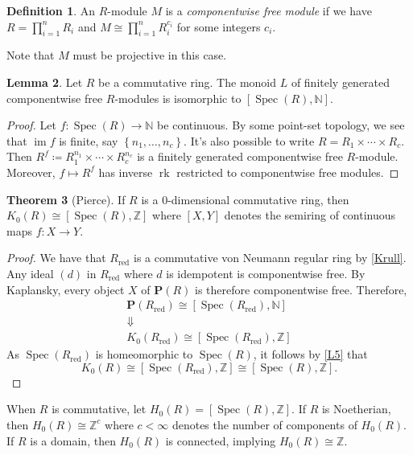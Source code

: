 \documentclass[10pt,letterpaper,cm]{nupset}
\theoremstyle{definition}
\newtheorem{definition}{Definition}[section]
\theoremstyle{theorem}
\newtheorem{theorem}[definition]{Theorem}
\newtheorem{lemma}[definition]{Lemma}
\theoremstyle{remark}
\newcommand{\N}{\mathbb N}
\renewcommand{\P}{\mathbf P}
\newcommand{\Z}{\mathbb Z}
\newcommand{\1}{\mathbf{1}}
\newcommand{\0}{\vec 0}
\DeclareMathOperator{\im}{im}
\DeclareMathOperator{\red}{red}
\DeclareMathOperator{\spec}{Spec}
\DeclareMathOperator{\rk}{rk}
\begin{document}
\begin{definition}
An $R$-module $M$ is a \textit{componentwise free module} if we have $R = \prod_{i=1}^n R_i$ and $M \cong \prod_{i=1}^n R_i^{c_i}$ for some integers $c_i$.
\end{definition}

Note that $M$ must be projective in this case.

\begin{lemma}\label{L6}
Let $R$ be a commutative ring. The monoid $L$ of finitely generated componentwise free $R$-modules is isomorphic to $\left[\spec(R), \N\right]$.
\end{lemma}
\begin{proof}
Let $f: \spec(R) \to \N$ be continuous. By some point-set topology, we see that $\im f$ is finite, say $\left\{n_1, \ldots, n_c\right\}$. It's also possible to write $R= R_1 \times \cdots \times R_c$. Then $R^f \coloneqq R_1^{n_1} \times \cdots \times R_c^{n_c}$ is a finitely generated componentwise free $R$-module. Moreover, $f \mapsto R^f$ has inverse $\rk$ restricted to componentwise free modules.
\end{proof}


\begin{theorem}[Pierce]
If $R$ is a $0$-dimensional commutative ring, then $K_0(R) \cong \left[\spec(R), \Z\right]$ where $\left[X, Y\right]$ denotes the semiring of continuous maps $f: X\to Y$.
\end{theorem}
\begin{proof}
We have that $R_{\red}$ is a commutative von Neumann regular ring by \cref{Krull}. Any ideal $(d)$ in $R_{\red}$  where $d$ is idempotent is componentwise free. By Kaplansky, every object $X$ of $\P(R)$ is therefore componentwise free. Therefore, 
\begin{gather*}
\P(R_{\red}) \cong \left[\spec(R_{\red}), \N\right]
\\ \Downarrow
\\ K_0(R_{\red}) \cong \left[\spec(R_{\red}), \Z\right]
\end{gather*}
As $\spec(R_{\red})$ is homeomorphic to $\spec(R)$, it follows by \cref{L5} that $$K_0(R)\cong \left[\spec(R_{\red}), \Z\right] \cong \left[\spec(R), \Z\right].$$
\end{proof}

\smallskip

When $R$ is commutative, let $H_0(R) = \left[\spec(R), \Z\right]$. If $R$ is Noetherian, then $H_0(R) \cong \Z^c$ where $c <\infty$ denotes the number of components of $H_0(R)$. If $R$ is a domain, then $H_0(R)$ is connected, implying $H_0(R) \cong \Z$.
\end{document}
